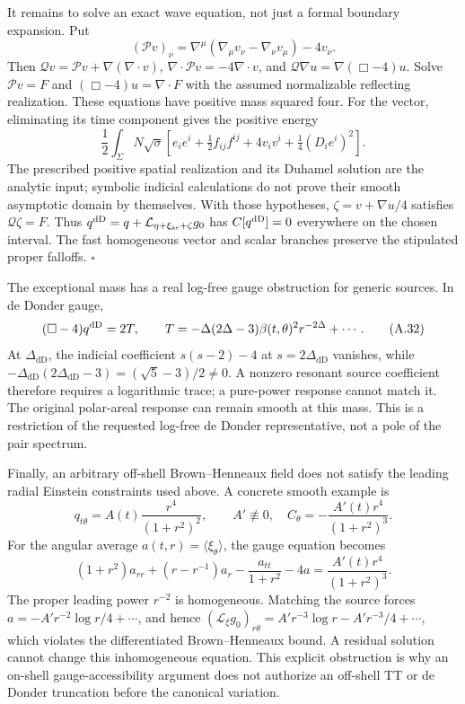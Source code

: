 \documentclass[a4paper,11pt]{article}
\numberwithin{equation}{section}
\begin{document}
It remains to solve an exact wave equation, not just a formal boundary expansion. Put \[
(\mathcal Pv)_\nu=\nabla^\mu(\nabla_\mu v_\nu-\nabla_\nu v_\mu)-4v_\nu.
\] Then \(\mathcal Qv=\mathcal Pv+\nabla(\nabla\cdot v)\), \(\nabla\cdot\mathcal Pv=-4\nabla\cdot v\), and \(\mathcal Q\nabla u=\nabla(\Box-4)u\). Solve \(\mathcal Pv=F\) and \((\Box-4)u=\nabla\cdot F\) with the assumed normalizable reflecting realization. These equations have positive mass squared four. For the vector, eliminating its time component gives the positive energy \[
\frac12\int_\Sigma N\sqrt\sigma
\left[e_ie^i+\tfrac12f_{ij}f^{ij}+4v_iv^i
+\tfrac14(D_ie^i)^2\right].
\] The prescribed positive spatial realization and its Duhamel solution are the analytic input; symbolic indicial calculations do not prove their smooth asymptotic domain by themselves. With those hypotheses, \(\zeta=v+\nabla u/4\) satisfies \(\mathcal Q\zeta=F\). Thus \(q^{\rm dD}=q+\mathcal L_{\eta+\xi_{\rm as}+\zeta}g_0\) has \(C[q^{\rm dD}]=0\) everywhere on the chosen interval. The fast homogeneous vector and scalar branches preserve the stipulated proper falloffs. \(\square\)

The exceptional mass has a real log-free gauge obstruction for generic sources. In de Donder gauge, \[
(\Box-4)q^{\rm dD}=2T,
\qquad
T=-\Delta(2\Delta-3)\beta(t,\theta)^2r^{-2\Delta}+\cdots .
\tag{A.32}
\] At \(\Delta_{\mathrm{dD}}\), the indicial coefficient \(s(s-2)-4\) at \(s=2\Delta_{\mathrm{dD}}\) vanishes, while \(-\Delta_{\mathrm{dD}}(2\Delta_{\mathrm{dD}}-3)=(\sqrt5-3)/2\ne0\). A nonzero resonant source coefficient therefore requires a logarithmic trace; a pure-power response cannot match it. The original polar-areal response can remain smooth at this mass. This is a restriction of the requested log-free de Donder representative, not a pole of the pair spectrum.

Finally, an arbitrary off-shell Brown--Henneaux field does not satisfy the leading radial Einstein constraints used above. A concrete smooth example is \[
q_{t\theta}=A(t)\frac{r^4}{(1+r^2)^2},\qquad A'\not\equiv0,
\quad C_\theta=-\frac{A'(t)r^4}{(1+r^2)^3}.
\] For the angular average \(a(t,r)=\langle\xi_\theta\rangle\), the gauge equation becomes \[
(1+r^2)a_{rr}+(r-r^{-1})a_r
-\frac{a_{tt}}{1+r^2}-4a
=\frac{A'(t)r^4}{(1+r^2)^3}.
\tag{A.33}
\] The proper leading power \(r^{-2}\) is homogeneous. Matching the source forces \(a=-A'r^{-2}\log r/4+\cdots\), and hence \((\mathcal L_\xi g_0)_{r\theta}=A'r^{-3}\log r-A'r^{-3}/4+\cdots\), which violates the differentiated Brown--Henneaux bound. A residual solution cannot change this inhomogeneous equation. This explicit obstruction is why an on-shell gauge-accessibility argument does not authorize an off-shell TT or de Donder truncation before the canonical variation.
\end{document}

